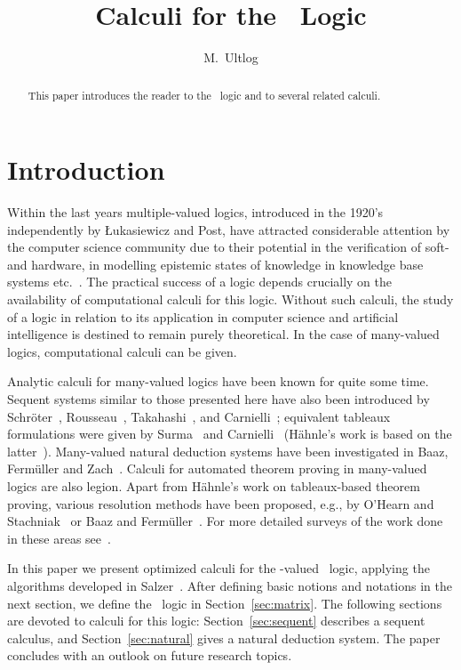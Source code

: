 \documentclass{article}
\title{Calculi for the \NameOfLogic\ Logic}
\author{M.~Ultlog}
\begin{document}

\maketitle

\begin{abstract}
This paper introduces the reader to the 
\NameOfLogic\ logic and to several
related calculi.
\end{abstract}

\section{Introduction}

Within the last years multiple-valued logics, introduced in the 1920's
independently by {\L}ukasiewicz and Post, have attracted considerable
attention by the computer science community due to their potential in the
verification of soft- and hardware, in modelling epistemic states of
knowledge in knowledge base systems etc.~\cite{Haehnle:93}.
The practical success of a logic depends crucially on the availability of
computational calculi for this logic.  Without such calculi, the study of
a logic in relation to its application in computer science and artificial
intelligence is destined to remain purely theoretical. In the case of
many-valued logics, computational calculi can be given.

Analytic calculi for many-valued logics have been known for quite some time.
Sequent systems similar to those presented here have also been introduced by
Schr\"oter~\cite{Schroeter:55}, Rousseau~\cite{Rousseau:67},
Takahashi~\cite{Takahashi:67}, and Carnielli~\cite{Carnielli:91};
equivalent tableaux formulations were given by Surma~\cite{Surma:77} and
Carnielli~\cite{Carnielli:87} (H\"ahnle's work is based on the
latter~\cite{Haehnle:91,Haehnle:92,Haehnle:93}). Many-valued natural deduction
systems have been investigated in Baaz, Ferm\"uller and
Zach~\cite{BaazFermZach93SMVL}. Calculi for automated theorem proving in
many-valued logics are also legion.  Apart from H\"ahnle's work on
tableaux-based theorem proving, various resolution methods have been proposed,
e.g., by O'Hearn and Stachniak~\cite{StachniakOHearn:92} or Baaz and
Ferm\"uller~\cite{BaazFerm92LPAR,BaazFerm95JSC}. For more detailed surveys of
the work done in these areas see~\cite{Haehnle:93,Zach93DA}.

In this paper we present optimized calculi for the \NoTVs-valued
\NameOfLogic\ logic, applying the algorithms developed in
Salzer~\cite{Salzer96CADE,Salzer96KGS}. After defining basic notions and
notations in the next section, we define the \NameOfLogic\ logic in
Section~\ref{sec:matrix}. The following sections are devoted to calculi
for this logic: Section~\ref{sec:sequent} describes a sequent calculus, and
Section~\ref{sec:natural} gives a natural deduction system. The paper
concludes with an outlook on future research topics.
\end{document}

